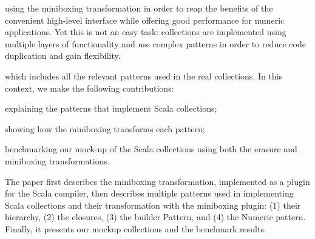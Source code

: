  using the miniboxing transformation in order to reap the benefits of the convenient high-level interface while offering good performance for numeric applications. Yet this is not an easy task: collections are implemented using multiple layers of functionality and use complex patterns in order to reduce code duplication and gain flexibility.

 which includes all the relevant patterns used in the real collections. In this context, we make the following contributions:

\begin{packed_item}
\item explaining the patterns that implement Scala collections;
\item showing how the miniboxing transforms each pattern;
\item benchmarking our mock-up of the Scala collections using both the erasure and miniboxing transformations.
\end{packed_item}

The paper first describes the miniboxing transformation, implemented as a plugin for the Scala compiler, then describes multiple patterns used in implementing Scala collections and their transformation with the miniboxing plugin: (1) their hierarchy, (2) the closures, (3) the builder Pattern, and (4) the Numeric pattern. Finally, it presents our mockup collections and the benchmark results.